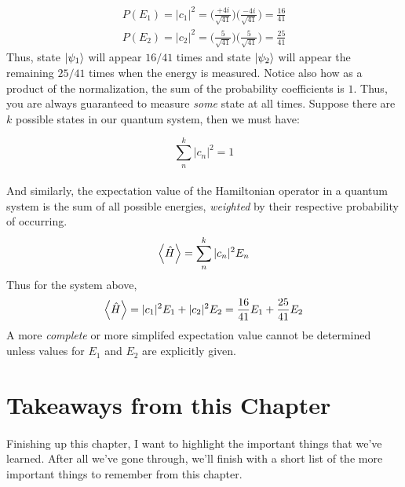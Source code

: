 \documentclass[12pt,letterpaper]{book}
\begin{document}
\begin{equation}
\begin{split}
P(E_1) = |c_1|^2 = \Big(\frac{+4i}{\sqrt{41}}\Big) \Big(\frac{-4i}{\sqrt{41}}\Big) = \frac{16}{41} \\
P(E_2) = |c_2|^2 = \Big(\frac{5}{\sqrt{41}}\Big) \Big(\frac{5}{\sqrt{41}}\Big) = \frac{25}{41}
\end{split}
\end{equation}
Thus, state $\ket{\psi_1}$ will appear $16/41$ times and state $\ket{\psi_2}$ will appear the remaining $25/41$ times when the energy is measured. Notice also how as a product of the normalization, the sum of the probability coefficients is $1$. Thus, you are always guaranteed to measure \textit{some} state at all times. Suppose there are $k$ possible states in our quantum system, then we must have:

\begin{equation}
\sum_n^k |c_n|^2 = 1
\end{equation}

\paragraph*{}And similarly, the expectation value of the Hamiltonian operator in a quantum system is the sum of all possible energies, \textit{weighted} by their respective probability of occurring.
\begin{equation}
\label{expect Hamiltionian}
\expval{\hat{H}} = \sum_n^k |c_n|^2 E_n
\end{equation}
Thus for the system above, 
\begin{equation}
\expval{\hat{H}} = |c_1|^2E_1 + |c_2|^2E_2 = \frac{16}{41}E_1 + \frac{25}{41}E_2
\end{equation}
A more \textit{complete} or more simplifed expectation value cannot be determined unless values for $E_1$ and $E_2$ are explicitly given.


\section{Takeaways from this Chapter}
\paragraph*{}Finishing up this chapter, I want to highlight the important things that we've learned. After all we've gone through, we'll finish with a short list of the more important things to remember from this chapter.
\end{document}
